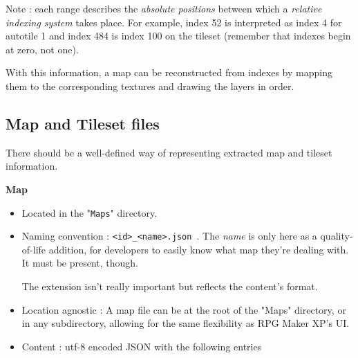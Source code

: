 \documentclass[11pt]{article}
\begin{document}
{\begin{itemize}
	Note : each range describes the \textit{absolute positions} between which a \textit{relative indexing system} takes place. For example, index 52 is interpreted as index 4 for autotile 1 and index 484 is index 100 on the tileset (remember that indexes begin at zero, not one).
	
\end{itemize}

With this information, a map can be reconstructed from indexes by mapping them to the corresponding textures and drawing the layers in order.




\subsection{Map and Tileset files}

There should be a well-defined way of representing extracted map and tileset information. 

\textbf{Map}
\begin{itemize}
	
	\item Located in the "\verb|Maps|" directory.
	
	\item Naming convention : \verb|<id>_<name>.json |. The \textit{name} is only here as a quality-of-life addition, for developers to easily know what map they're dealing with. It must be present, though.
	
	The extension isn't really important but reflects the content's format.
	
	\item Location agnostic : A map file can be at the root of the "Maps" directory, or in any subdirectory, allowing for the same flexibility as RPG Maker XP's UI.
	
	
	\item Content : utf-8 encoded JSON with the following entries
	

\end{itemize}}
\end{document}
